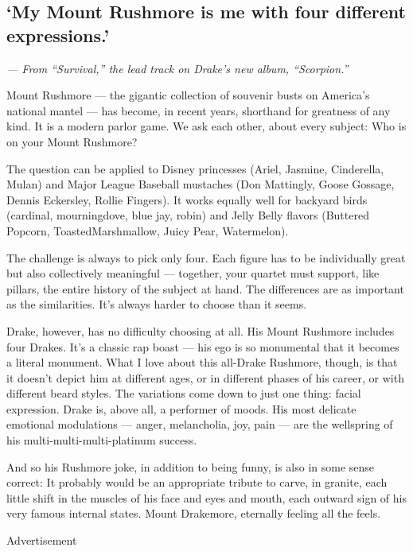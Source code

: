 \hypertarget{my-mount-rushmore-is-me-with-four-different-expressions}{%
\subsection{`My Mount Rushmore is me with four different
expressions.'}\label{my-mount-rushmore-is-me-with-four-different-expressions}}

\emph{--- From ``Survival,'' the lead track on Drake's new album,
``Scorpion.''}

Mount Rushmore --- the gigantic collection of souvenir busts on
America's national mantel --- has become, in recent years, shorthand for
greatness of any kind. It is a modern parlor game. We ask each other,
about every subject: Who is on your Mount Rushmore?

The question can be applied to Disney princesses (Ariel, Jasmine,
Cinderella, Mulan) and Major League Baseball mustaches (Don Mattingly,
Goose Gossage, Dennis Eckersley, Rollie Fingers). It works equally well
for backyard birds (cardinal, mourningdove, blue jay, robin) and Jelly
Belly flavors (Buttered Popcorn, ToastedMarshmallow, Juicy Pear,
Watermelon).

The challenge is always to pick only four. Each figure has to be
individually great but also collectively meaningful --- together, your
quartet must support, like pillars, the entire history of the subject at
hand. The differences are as important as the similarities. It's always
harder to choose than it seems.

Drake, however, has no difficulty choosing at all. His Mount Rushmore
includes four Drakes. It's a classic rap boast --- his ego is so
monumental that it becomes a literal monument. What I love about this
all-Drake Rushmore, though, is that it doesn't depict him at different
ages, or in different phases of his career, or with different beard
styles. The variations come down to just one thing: facial expression.
Drake is, above all, a performer of moods. His most delicate emotional
modulations --- anger, melancholia, joy, pain --- are the wellspring of
his multi-multi-multi-platinum success.

And so his Rushmore joke, in addition to being funny, is also in some
sense correct: It probably would be an appropriate tribute to carve, in
granite, each little shift in the muscles of his face and eyes and
mouth, each outward sign of his very famous internal states. Mount
Drakemore, eternally feeling all the feels.

Advertisement

